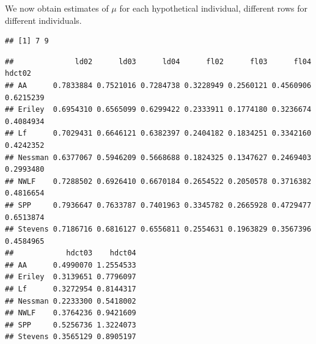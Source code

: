 \documentclass[
  ignorenonframetext,
]{beamer}
\newenvironment{Shaded}{\begin{snugshade}}{\end{snugshade}}
\newcommand{\AttributeTok}[1]{\textcolor[rgb]{0.13,0.29,0.53}{#1}}
\newcommand{\FunctionTok}[1]{\textcolor[rgb]{0.13,0.29,0.53}{\textbf{#1}}}
\newcommand{\NormalTok}[1]{#1}
\newcommand{\OtherTok}[1]{\textcolor[rgb]{0.56,0.35,0.01}{#1}}
\newcommand{\SpecialCharTok}[1]{\textcolor[rgb]{0.81,0.36,0.00}{\textbf{#1}}}
\begin{document}
\begin{frame}[fragile]{}
\protect\hypertarget{section-34}{}
We now obtain estimates of \(\mu\) for each hypothetical individual,
different rows for different individuals.

\vspace{12pt}
\tiny

\begin{Shaded}
\end{Shaded}

\begin{verbatim}
## [1] 7 9
\end{verbatim}

\begin{Shaded}
\end{Shaded}

\begin{verbatim}
##              ld02      ld03      ld04      fl02      fl03      fl04    hdct02
## AA      0.7833884 0.7521016 0.7284738 0.3228949 0.2560121 0.4560906 0.6215239
## Eriley  0.6954310 0.6565099 0.6299422 0.2333911 0.1774180 0.3236674 0.4084934
## Lf      0.7029431 0.6646121 0.6382397 0.2404182 0.1834251 0.3342160 0.4242352
## Nessman 0.6377067 0.5946209 0.5668688 0.1824325 0.1347627 0.2469403 0.2993480
## NWLF    0.7288502 0.6926410 0.6670184 0.2654522 0.2050578 0.3716382 0.4816654
## SPP     0.7936647 0.7633787 0.7401963 0.3345782 0.2665928 0.4729477 0.6513874
## Stevens 0.7186716 0.6816127 0.6556811 0.2554631 0.1963829 0.3567396 0.4584965
##            hdct03    hdct04
## AA      0.4990070 1.2554533
## Eriley  0.3139651 0.7796097
## Lf      0.3272954 0.8144317
## Nessman 0.2233300 0.5418002
## NWLF    0.3764236 0.9421609
## SPP     0.5256736 1.3224073
## Stevens 0.3565129 0.8905197
\end{verbatim}
\end{frame}
\end{document}
